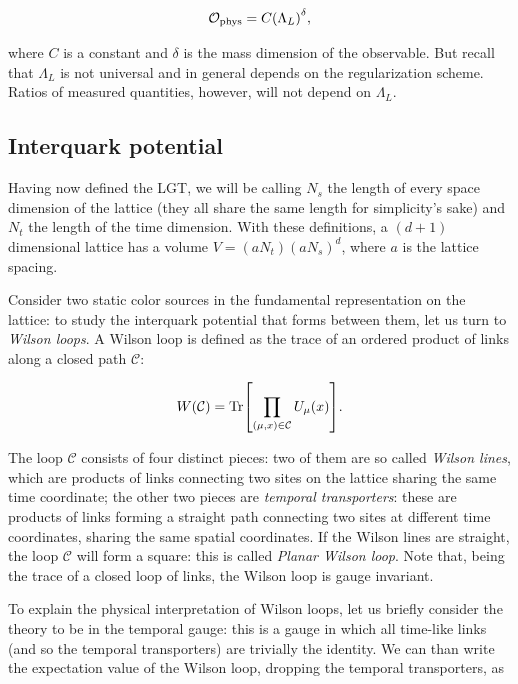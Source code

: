 \documentclass[reqno,12pt]{article}
\numberwithin{equation}{section}
\begin{document}
\begin{equation}
	\mathcal{O}_\text{phys} = C \qty(\Lambda_L)^\delta,
\end{equation}

where $C$ is a constant and $\delta$ is the mass dimension of the observable. But recall that $\Lambda_L$ is not universal and
in general depends on the regularization scheme. Ratios of measured quantities, however, will not depend on $\Lambda_L$.

\subsection{Interquark potential} \label{potential}

Having now defined the LGT, we will be calling $N_s$ the length of every space dimension of the lattice (they 
all share the same length for simplicity's sake) and $N_t$ the length of the time dimension. With these definitions,
a $(d+1)$ dimensional lattice has a volume $V = (aN_t)(aN_s)^d$, where $a$ is the lattice spacing.

Consider two static color sources in the fundamental representation
on the lattice: to study the interquark potential that forms between them,
let us turn to \textit{Wilson loops}. A Wilson loop is defined as the trace of an ordered product 
of links along a closed path $\mathcal{C}$:

\begin{equation}
	W(\mathcal{C}) = \Tr[\prod_{(\mu,x)\in\mathcal{C}} U_\mu(x)].
\end{equation}

The loop $\mathcal{C}$ consists of four distinct pieces: two of them are so called \textit{Wilson lines}, which are 
products of links connecting two sites on the lattice sharing the same time coordinate; the other two pieces
are \textit{temporal transporters}: these are products of links forming a straight path connecting two sites at
different time coordinates, sharing the same spatial coordinates. If the Wilson lines are straight, the loop
$\mathcal{C}$ will form a square: this is called \textit{Planar Wilson loop}. Note that, being the trace of a closed
loop of links, the Wilson loop is gauge invariant.

To explain the physical interpretation of Wilson loops, let us briefly consider the theory to be in the temporal
gauge: this is a gauge in which all time-like links (and so the temporal transporters) are trivially the identity.
We can than write the expectation value of the Wilson loop, dropping the temporal transporters, as 
\end{document}
